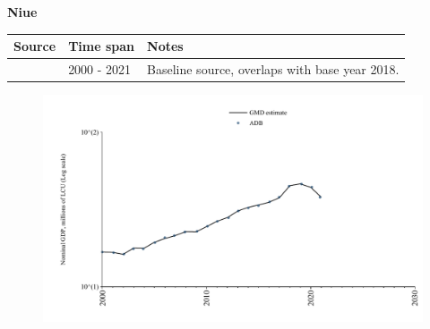 \documentclass[12pt,a4paper,landscape]{article}
\begin{document}
\begin{adjustbox}{max totalsize={\paperwidth}{\paperheight},center}
\begin{minipage}[t][\textheight][t]{\textwidth}
\vspace*{0.5cm}
{}
\begin{center}
{\Large\bfseries Niue}
\end{center}
\vspace{0.5cm}
\begin{table}[H]
\centering
\small
\begin{tabular}{|l|l|l|}
\hline
\textbf{Source} & \textbf{Time span} & \textbf{Notes} \\
\hline
\rowcolor{white}\cite{ADB}& 2000 - 2021 &Baseline source, overlaps with base year 2018.\\
\hline
\end{tabular}
\end{table}
\begin{figure}[H]
\centering
\includegraphics[width=\textwidth,height=0.6\textheight,keepaspectratio]{graphs/NIU_nGDP.pdf}
\end{figure}
\end{minipage}
\end{adjustbox}
\end{document}
